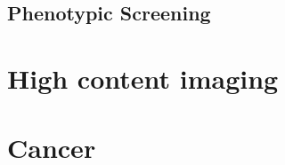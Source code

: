 \documentclass[a4paper,11pt,twoside,openright]{scrbook}
\begin{document}

\subsection{Phenotypic Screening}

\section{High content imaging}

\section{Cancer}

\end{document}
